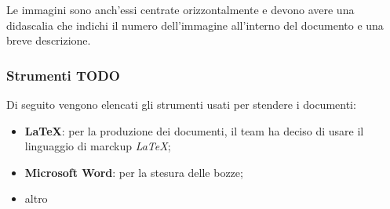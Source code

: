 Le immagini sono anch'essi centrate orizzontalmente e devono avere una didascalia che indichi il numero dell'immagine all'interno del documento e una breve descrizione.

\subsubsection{Strumenti TODO}
Di seguito vengono elencati gli strumenti usati per stendere i documenti:
\begin {itemize}
\item \textbf{\LaTeX}: per la produzione dei documenti, il team ha deciso di usare il linguaggio di marckup \textit{\LaTeX};
\item \textbf{Microsoft Word}: per la stesura delle bozze;
\item altro
\end {itemize}